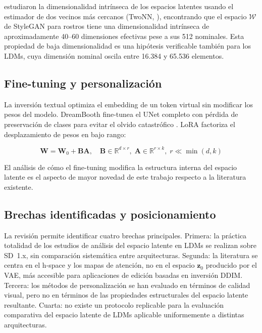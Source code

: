 \documentclass[12pt, a4paper, twoside]{book}
\newcommand{\z}{\mathbf{z}}
\newcommand{\R}{\mathbb{R}}
\begin{document}
\citet{pope2021intrinsic} estudiaron la dimensionalidad intrínseca de los espacios latentes usando el estimador de dos vecinos más cercanos (TwoNN, \citealp{facco2017twonn}), encontrando que el espacio $\mathcal{W}$ de StyleGAN para rostros tiene una dimensionalidad intrínseca de aproximadamente 40--60 dimensiones efectivas pese a sus 512 nominales. Esta propiedad de baja dimensionalidad es una hipótesis verificable también para los LDMs, cuya dimensión nominal oscila entre 16.384 y 65.536 elementos.

\subsection{Fine-tuning y personalización}

La inversión textual \citep{gal2022textual} optimiza el embedding de un token virtual sin modificar los pesos del modelo. DreamBooth \citep{ruiz2023dreambooth} fine-tunea el UNet completo con pérdida de preservación de clases para evitar el olvido catastrófico \citep{mccloskey1989catastrophic,kirkpatrick2017ewc}. LoRA \citep{hu2022lora} factoriza el desplazamiento de pesos en bajo rango:

\begin{equation}
\mathbf{W} = \mathbf{W}_0 + \mathbf{B}\mathbf{A},
\quad \mathbf{B} \in \R^{d \times r},\; \mathbf{A} \in \R^{r \times k},\; r \ll \min(d, k)
\end{equation}

El análisis de cómo el fine-tuning modifica la estructura interna del espacio latente es el aspecto de mayor novedad de este trabajo respecto a la literatura existente.

\subsection{Brechas identificadas y posicionamiento}

La revisión permite identificar cuatro brechas principales. Primera: la práctica totalidad de los estudios de análisis del espacio latente en LDMs se realizan sobre SD~1.x, sin comparación sistemática entre arquitecturas. Segunda: la literatura se centra en el h-space y los mapas de atención, no en el espacio $\z_0$ producido por el VAE, más accesible para aplicaciones de edición basadas en inversión DDIM. Tercera: los métodos de personalización se han evaluado en términos de calidad visual, pero no en términos de las propiedades estructurales del espacio latente resultante. Cuarta: no existe un protocolo replicable para la evaluación comparativa del espacio latente de LDMs aplicable uniformemente a distintas arquitecturas.
\end{document}
